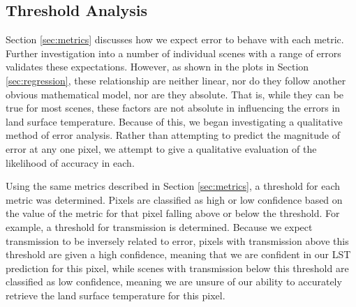 \documentclass{book}
\begin{document}
\subsection{Threshold Analysis}
\label{sec:threshold}

Section \ref{sec:metrics} discusses how we expect error to behave with each metric.  Further investigation into a number of individual scenes with a range of errors validates these expectations.  However, as shown in the plots in Section \ref{sec:regression}, these relationship are neither linear, nor do they follow another obvious mathematical model, nor are they absolute.  That is, while they can be true for most scenes, these factors are not absolute in influencing the errors in land surface temperature.  Because of this, we began investigating a qualitative method of error analysis.  Rather than attempting to predict the magnitude of error at any one pixel, we attempt to give a qualitative evaluation of the likelihood of accuracy in each.

Using the same metrics described in Section \ref{sec:metrics}, a threshold for each metric was determined.  Pixels are classified as high or low confidence based on the value of the metric for that pixel falling above or below the threshold.  For example, a threshold for transmission is determined.  Because we expect transmission to be inversely related to error, pixels with transmission above this threshold are given a high confidence, meaning that we are confident in our LST prediction for this pixel, while scenes with transmission below this threshold are classified as low confidence, meaning we are unsure of our ability to accurately retrieve the land surface temperature for this pixel.
\end{document}
